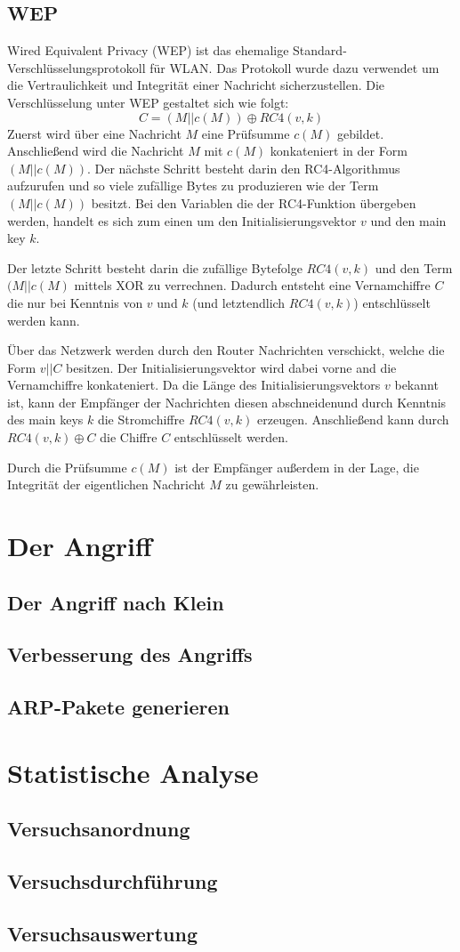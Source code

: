 \documentclass[10pt,a4paper]{article}
\begin{document}
\subsection{WEP}
Wired Equivalent Privacy (WEP) ist das ehemalige Standard-Verschlüsselungsprotokoll für WLAN. Das Protokoll wurde dazu verwendet um die Vertraulichkeit und Integrität einer Nachricht sicherzustellen. Die Verschlüsselung unter WEP gestaltet sich wie folgt:
$$
C = (M || c(M)) \oplus RC4(v,k)
$$
Zuerst wird über eine Nachricht $M$ eine Prüfsumme $c(M)$ gebildet. Anschließend wird die Nachricht $M$ mit $c(M)$ konkateniert in der Form $(M || c(M))$. Der nächste Schritt besteht darin den RC4-Algorithmus aufzurufen und so viele zufällige Bytes zu produzieren wie der Term $(M || c(M))$ besitzt. Bei den Variablen die der RC4-Funktion übergeben werden, handelt es sich zum einen um den Initialisierungsvektor $v$ und den main key $k$.

Der letzte Schritt besteht darin die zufällige Bytefolge $RC4(v,k)$ und den Term $(M || c(M)$ mittels XOR zu verrechnen. Dadurch entsteht eine Vernamchiffre $C$ die nur bei Kenntnis von $v$ und $k$ (und letztendlich $RC4(v,k)$) entschlüsselt werden kann.

Über das Netzwerk werden durch den Router Nachrichten verschickt, welche die Form $v || C$ besitzen. Der Initialisierungsvektor wird dabei vorne and die Vernamchiffre konkateniert. Da die Länge des Initialisierungsvektors $v$ bekannt ist, kann der Empfänger der Nachrichten diesen \glqq abschneiden\grqq und durch Kenntnis des main keys $k$ die Stromchiffre $RC4(v,k)$ erzeugen. Anschließend kann durch $RC4(v,k) \oplus C$ die Chiffre $C$ entschlüsselt werden.

Durch die Prüfsumme $c(M)$ ist der Empfänger außerdem in der Lage, die Integrität der eigentlichen Nachricht $M$ zu gewährleisten. 

\section{Der Angriff}
\subsection{Der Angriff nach Klein}
\subsection{Verbesserung des Angriffs}
\subsection{ARP-Pakete generieren}
\section{Statistische Analyse}
\subsection{Versuchsanordnung}
\subsection{Versuchsdurchführung}
\subsection{Versuchsauswertung}
\end{document}
